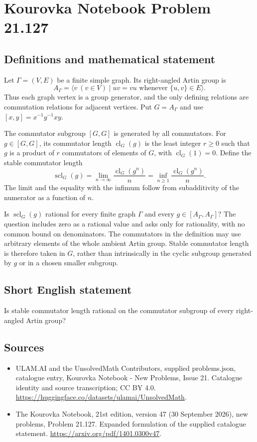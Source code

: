 \documentclass[11pt,a4paper]{article}
\begin{document}
\section*{Kourovka Notebook Problem 21.127}\label{statement}

\subsection{Definitions and mathematical statement}
Let $\Gamma=(V,E)$ be a finite simple graph. Its right-angled Artin group is
\[
 A_\Gamma=\langle v\ (v\in V)\mid uv=vu\text{ whenever }\{u,v\}\in E\rangle.
\]
Thus each graph vertex is a group generator, and the only defining relations are commutation relations for adjacent vertices. Put $G=A_\Gamma$ and use $[x,y]=x^{-1}y^{-1}xy$.

The commutator subgroup $[G,G]$ is generated by all commutators. For $g\in[G,G]$, its commutator length $\operatorname{cl}_G(g)$ is the least integer $r\ge0$ such that $g$ is a product of $r$ commutators of elements of $G$, with $\operatorname{cl}_G(1)=0$. Define the stable commutator length
\[
 \operatorname{scl}_G(g)=\lim_{n\to\infty}
 \frac{\operatorname{cl}_G(g^n)}{n}
 =\inf_{n\ge1}\frac{\operatorname{cl}_G(g^n)}{n}.
\]
The limit and the equality with the infimum follow from subadditivity of the numerator as a function of $n$.

Is $\operatorname{scl}_G(g)$ rational for every finite graph $\Gamma$ and every $g\in[A_\Gamma,A_\Gamma]$? The question includes zero as a rational value and asks only for rationality, with no common bound on denominators. The commutators in the definition may use arbitrary elements of the whole ambient Artin group. Stable commutator length is therefore taken in $G$, rather than intrinsically in the cyclic subgroup generated by $g$ or in a chosen smaller subgroup.
\subsection{Short English statement}
Is stable commutator length rational on the commutator subgroup of every right-angled Artin group?
\subsection{Sources}
\begin{itemize}
\item[S1] ULAM.AI and the UnsolvedMath Contributors, supplied problems.json, catalogue entry, Kourovka Notebook - New Problems, Issue 21. Catalogue identity and source transcription; CC BY 4.0.
\url{https://huggingface.co/datasets/ulamai/UnsolvedMath}.
\item[S2] The Kourovka Notebook, 21st edition, version 47 (30 September 2026), new problems, Problem 21.127. Expanded formulation of the supplied catalogue statement.
\url{https://arxiv.org/pdf/1401.0300v47}.
\end{itemize}
\end{document}
